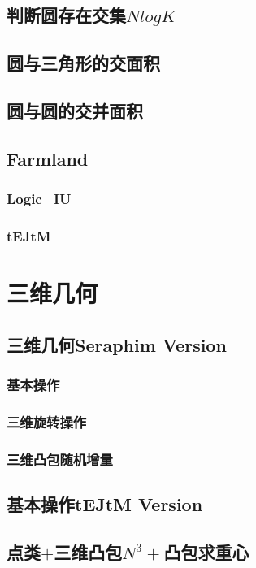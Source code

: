 \documentclass[a4paper,10pt]{book}
\begin{document}
	\section{判断圆存在交集$NlogK$}
		
	\section{圆与三角形的交面积}
	    
	\section{圆与圆的交并面积}
		
	\section{Farmland}
		\subsection{Logic\_IU}
			
		\subsection{tEJtM}
			

\chapter{三维几何}
	\section{三维几何Seraphim Version}
	    \subsection{基本操作}
			
		\subsection{三维旋转操作}
			
		\subsection{三维凸包随机增量}
			
	\section{基本操作tEJtM Version}
		
	\section{点类$+$三维凸包$N^3+$凸包求重心}
		
\end{document}

